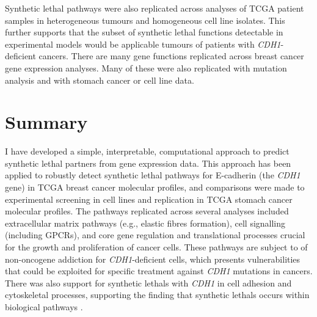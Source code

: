 Synthetic lethal \glspl{pathway} were also replicated across  analyses of \gls{TCGA} patient samples in heterogeneous tumours and homogeneous cell line isolates. This further supports that the subset of \gls{synthetic lethal} functions detectable in experimental models \citep{Chen2014, Telford2015} would be applicable tumours of patients with \textit{CDH1}-deficient cancers.
%
There are many gene functions replicated across breast cancer \gls{gene expression} analyses. Many of these were also replicated with \gls{mutation} analysis and with stomach cancer or cell line  data. %

\section{Summary}

I have developed a simple, interpretable, computational approach to predict \gls{synthetic lethal} partners from \gls{gene expression} data. %
%
This approach has been applied to robustly detect \gls{synthetic lethal} \glspl{pathway} for \gls{E-cadherin} (the \textit{CDH1} gene) in \gls{TCGA} breast cancer molecular profiles, and comparisons were made to experimental screening \citep{Telford2015} in cell lines and replication in \gls{TCGA} stomach cancer molecular profiles. %
The \glspl{pathway} replicated across several analyses included extracellular matrix \glspl{pathway} (e.g., elastic fibres formation), cell signalling (including \glspl{GPCR}), and core gene regulation and translational processes crucial for the growth and proliferation of cancer cells. These \glspl{pathway} are subject to of \gls{non-oncogene addiction} for \textit{CDH1}-deficient cells, which presents vulnerabilities that could be exploited for specific treatment against \textit{CDH1} \glspl{mutation} in cancers. There was also support for \glspl{synthetic lethal} with \textit{CDH1} in cell adhesion and cytoskeletal processes, supporting the finding that \glspl{synthetic lethal} occurs within biological \glspl{pathway} \citep{Kelley2005, Boone2007}.

